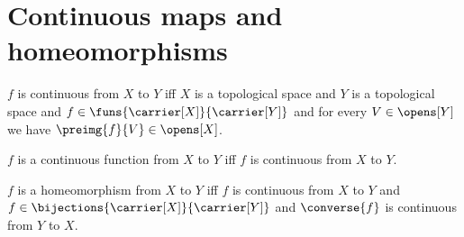 



\section{Continuous maps and homeomorphisms}

\begin{definition}\label{continuous_map}
    $f$ is continuous from $X$ to $Y$ iff
        $X$ is a topological space and
        $Y$ is a topological space and
        $f\in\funs{\carrier[X]}{\carrier[Y]}$ and
        for every $V\in\opens[Y]$ we have
            $\preimg{f}{V}\in\opens[X]$.
\end{definition}

\begin{abbreviation}\label{continuous_function_from_to}
    $f$ is a continuous function from $X$ to $Y$ iff
        $f$ is continuous from $X$ to $Y$.
\end{abbreviation}

\begin{definition}\label{homeomorphism}
    $f$ is a homeomorphism from $X$ to $Y$ iff
        $f$ is continuous from $X$ to $Y$ and
        $f\in\bijections{\carrier[X]}{\carrier[Y]}$ and
        $\converse{f}$ is continuous from $Y$ to $X$.
\end{definition}

